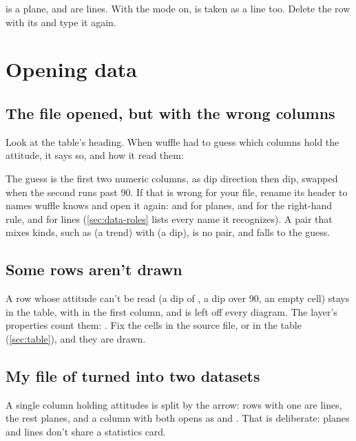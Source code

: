  is a plane,  and  are lines. With the  mode on,
 is taken as a line too. Delete the row with its  and type it again.

\section{Opening data}\label{sec:trouble-data}

\subsection{The file opened, but with the wrong columns}

Look at the table's heading. When wuffle had to guess which columns hold the attitude, it says so, and
how it read them:


The guess is the first two numeric columns, as dip direction then dip, swapped when the second runs past
90. If that is wrong for your file, rename its header to names wuffle knows and open it again:
 and  for planes,  and  for the right-hand rule, 
and  for lines (\cref{sec:data-roles} lists every name it recognizes). A pair that mixes
kinds, such as  (a trend) with  (a dip), is no pair, and falls to the
guess.

\subsection{Some rows aren't drawn}

A row whose attitude can't be read (a dip of , a dip over 90, an empty cell) stays in the
table, with  in the first column, and is left off every diagram. The layer's properties count
them: . Fix the cells in the source file, or in the table
(\cref{sec:table}), and they are drawn.

\subsection{My file of  turned into two datasets}

A single column holding attitudes is split by the arrow: rows with one are lines, the rest planes, and a
column with both opens as  and . That is deliberate: planes
and lines don't share a statistics card.

